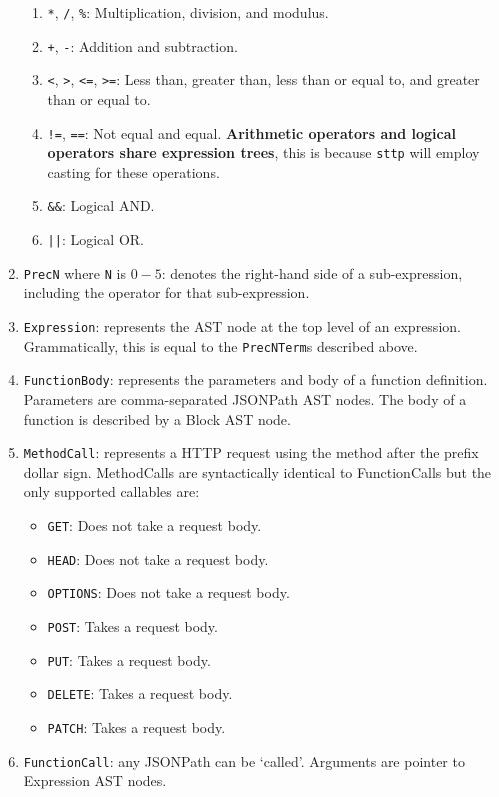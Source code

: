 \begin{enumerate}
    \begin{enumerate}
        \item \verb|*|, \verb|/|, \verb|%|: Multiplication, division, and modulus.
        \item \verb|+|, \verb|-|: Addition and subtraction.
        \item \verb|<|, \verb|>|, \verb|<=|, \verb|>=|: Less than, greater than, less than or equal to, and greater than or equal to.
        \item \verb|!=|, \verb|==|: Not equal and equal. \textbf{Arithmetic operators and logical operators share expression trees}, this is because \verb|sttp| will employ casting for these operations.
        \item \verb|&&|: Logical AND.
        \item \verb+||+: Logical OR.
    \end{enumerate}
    \item \verb|PrecN| where \verb|N| is $0-5$: denotes the right-hand side of a sub-expression, including the operator for that sub-expression.
    \item \verb|Expression|: represents the AST node at the top level of an expression. Grammatically, this is equal to the \verb|PrecNTerm|s described above.
    \item \verb|FunctionBody|: represents the parameters and body of a function definition. Parameters are comma-separated JSONPath AST nodes. The body of a function is described by a Block AST node.
    \item \verb|MethodCall|: represents a HTTP request using the method after the prefix dollar sign. MethodCalls are syntactically identical to FunctionCalls but the only supported callables are:
    \begin{itemize}
        \item \verb|GET|: Does not take a request body.
        \item \verb|HEAD|: Does not take a request body.
        \item \verb|OPTIONS|: Does not take a request body.
        \item \verb|POST|: Takes a request body.
        \item \verb|PUT|: Takes a request body.
        \item \verb|DELETE|: Takes a request body.
        \item \verb|PATCH|: Takes a request body.
    \end{itemize}
    \item \verb|FunctionCall|: any JSONPath can be `called'. Arguments are pointer to Expression AST nodes.

\end{enumerate}
